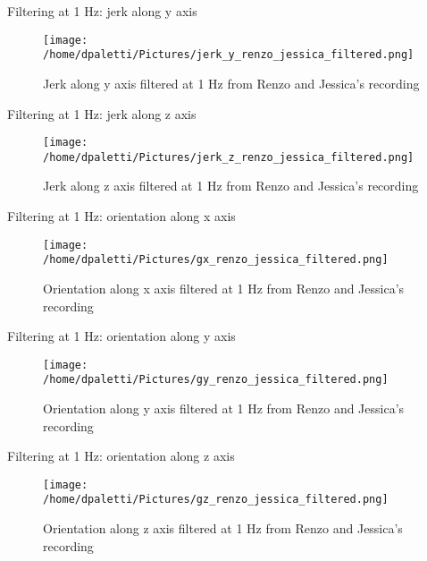 \documentclass[presentation]{beamer}
\begin{document}
\begin{frame}[label={sec:org5e1326f}]{Filtering at 1 Hz: jerk along y axis}
\begin{figure}[htbp]
\centering
\texttt{[image: /home/dpaletti/Pictures/jerk\_y\_renzo\_jessica\_filtered.png]}
\caption{\label{fig:speed_alberto_jessica}Jerk along y axis filtered at 1 Hz from Renzo and Jessica's recording}
\end{figure}
\end{frame}
\begin{frame}[label={sec:org0140e8e}]{Filtering at 1 Hz: jerk along z axis}
\begin{figure}[htbp]
\centering
\texttt{[image: /home/dpaletti/Pictures/jerk\_z\_renzo\_jessica\_filtered.png]}
\caption{\label{fig:speed_alberto_jessica}Jerk along z axis filtered at 1 Hz from Renzo and Jessica's recording}
\end{figure}
\end{frame}
\begin{frame}[label={sec:orgf23e204}]{Filtering at 1 Hz: orientation along x axis}
\begin{figure}[htbp]
\centering
\texttt{[image: /home/dpaletti/Pictures/gx\_renzo\_jessica\_filtered.png]}
\caption{\label{fig:speed_alberto_jessica}Orientation along x axis filtered at 1 Hz from Renzo and Jessica's recording}
\end{figure}
\end{frame}
\begin{frame}[label={sec:orgdfb739b}]{Filtering at 1 Hz: orientation along y axis}
\begin{figure}[htbp]
\centering
\texttt{[image: /home/dpaletti/Pictures/gy\_renzo\_jessica\_filtered.png]}
\caption{\label{fig:speed_alberto_jessica}Orientation along y axis filtered at 1 Hz from Renzo and Jessica's recording}
\end{figure}
\end{frame}
\begin{frame}[label={sec:org8eea099}]{Filtering at 1 Hz: orientation along z axis}
\begin{figure}[htbp]
\centering
\texttt{[image: /home/dpaletti/Pictures/gz\_renzo\_jessica\_filtered.png]}
\caption{\label{fig:speed_alberto_jessica}Orientation along z axis filtered at 1 Hz from Renzo and Jessica's recording}
\end{figure}
\end{frame}
\end{document}
